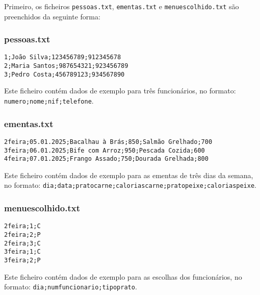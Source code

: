 \documentclass[a4paper,12pt]{report}
\begin{document}
Primeiro, os ficheiros \texttt{pessoas.txt}, \texttt{ementas.txt} e \texttt{menu\textunderscore escolhido.txt} são preenchidos da seguinte forma:

\subsubsection{pessoas.txt}
\begin{lstlisting}[caption={Exemplo do ficheiro pessoas.txt},label=lst:pessoas_txt]
1;João Silva;123456789;912345678
2;Maria Santos;987654321;923456789
3;Pedro Costa;456789123;934567890
\end{lstlisting}
Este ficheiro contém dados de exemplo para três funcionários, no formato: \texttt{numero;nome;nif;telefone}.

\subsubsection{ementas.txt}
\begin{lstlisting}[caption={Exemplo do ficheiro ementas.txt},label=lst:ementas_txt]
2feira;05.01.2025;Bacalhau à Brás;850;Salmão Grelhado;700
3feira;06.01.2025;Bife com Arroz;950;Pescada Cozida;600
4feira;07.01.2025;Frango Assado;750;Dourada Grelhada;800
\end{lstlisting}
Este ficheiro contém dados de exemplo para as ementas de três dias da semana, no formato: \texttt{dia;data;prato\textunderscore carne;calorias\textunderscore carne;prato\textunderscore peixe;calorias\textunderscore peixe}.

\subsubsection{menu\textunderscore escolhido.txt}
\begin{lstlisting}[caption={Exemplo do ficheiro menu\textunderscore escolhido.txt},label=lst:menu_txt]
2feira;1;C
2feira;2;P
2feira;3;C
3feira;1;C
3feira;2;P
\end{lstlisting}
Este ficheiro contém dados de exemplo para as escolhas dos funcionários, no formato: \texttt{dia;num\textunderscore funcionario;tipo\textunderscore prato}.
\end{document}
